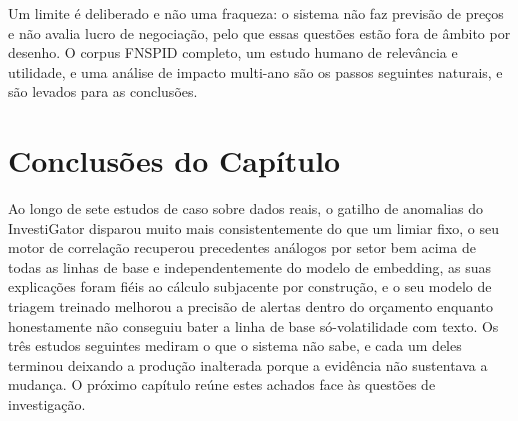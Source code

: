 Um limite é deliberado e não uma fraqueza: o sistema não faz previsão de preços e não avalia lucro de
negociação, pelo que essas questões estão fora de âmbito por desenho. O corpus FNSPID completo, um estudo humano
de relevância e utilidade, e uma análise de impacto multi-ano são os passos seguintes naturais, e são levados
para as conclusões.

\section{Conclusões do Capítulo}
\label{sec:cs_summary}

Ao longo de sete estudos de caso sobre dados reais, o gatilho de anomalias do InvestiGator disparou muito mais
consistentemente do que um limiar fixo, o seu motor de correlação recuperou precedentes análogos por setor bem
acima de todas as linhas de base e independentemente do modelo de embedding, as suas explicações foram fiéis ao
cálculo subjacente por construção, e o seu modelo de triagem treinado melhorou a precisão de alertas
dentro do orçamento enquanto honestamente não conseguiu bater a linha de base só-volatilidade com texto. Os
três estudos seguintes mediram o que o sistema não sabe, e cada um deles terminou deixando a produção
inalterada porque a evidência não sustentava a mudança. O próximo capítulo reúne estes achados face às
questões de investigação.
